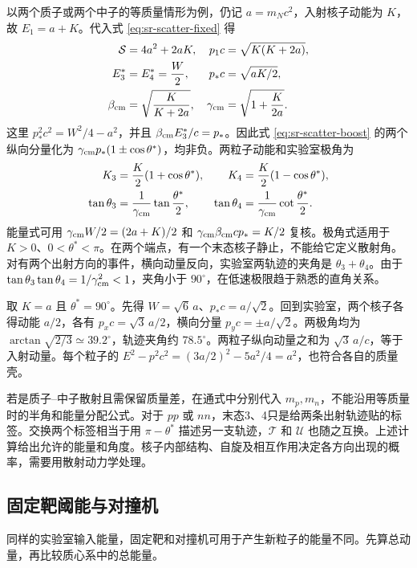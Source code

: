 以两个质子或两个中子的等质量情形为例，仍记 $a=m_Nc^2$，入射核子动能为 $K$，故 $E_1=a+K$。代入式 \eqref{eq:sr-scatter-fixed} 得
\begin{align*}
\mathcal S&=4a^2+2aK,& p_1c&=\sqrt{K(K+2a)},\\
E_3^*&=E_4^*=\frac{W}{2},&
p_*c&=\sqrt{aK/2},\\
\beta_{\rm cm}&=\sqrt{\frac{K}{K+2a}},&
\gamma_{\rm cm}&=\sqrt{1+\frac{K}{2a}} .
\end{align*}
这里 $p_*^2c^2=W^2/4-a^2$，并且 $\beta_{\rm cm}E_3^*/c=p_*$。因此式 \eqref{eq:sr-scatter-boost} 的两个纵向分量化为 $\gamma_{\rm cm}p_*(1\pm\cos\theta^*)$，均非负。两粒子动能和实验室极角为
\begin{align}
K_3&=\frac K2(1+\cos\theta^*),&
K_4&=\frac K2(1-\cos\theta^*),\nonumber\\
\tan\theta_3&=\frac{1}{\gamma_{\rm cm}}\tan\frac{\theta^*}{2},&
\tan\theta_4&=\frac{1}{\gamma_{\rm cm}}\cot\frac{\theta^*}{2}.
\label{eq:sr-nn-lab}
\end{align}
能量式可用 $\gamma_{\rm cm}W/2=(2a+K)/2$ 和 $\gamma_{\rm cm}\beta_{\rm cm}cp_*=K/2$ 复核。极角式适用于 $K>0$、$0<\theta^*<\pi$。在两个端点，有一个末态核子静止，不能给它定义散射角。对有两个出射方向的事件，横向动量反向，实验室两轨迹的夹角是 $\theta_3+\theta_4$。由于 $\tan\theta_3\tan\theta_4=1/\gamma_{\rm cm}^2<1$，夹角小于 $90^\circ$，在低速极限趋于熟悉的直角关系。

\begin{example}[质心系直角散射怎样分配动能]
取 $K=a$ 且 $\theta^*=90^\circ$。先得 $W=\sqrt6\,a$、$p_*c=a/\sqrt2$。回到实验室，两个核子各得动能 $a/2$，各有 $p_xc=\sqrt3\,a/2$，横向分量 $p_yc=\pm a/\sqrt2$。两极角均为 $\arctan\sqrt{2/3}\simeq39.2^\circ$，轨迹夹角约 $78.5^\circ$。两粒子纵向动量之和为 $\sqrt3\,a/c$，等于入射动量。每个粒子的 $E^2-p^2c^2=(3a/2)^2-5a^2/4=a^2$，也符合各自的质量壳。
\end{example}

若是质子--中子散射且需保留质量差，在通式中分别代入 $m_p,m_n$，不能沿用等质量时的半角和能量分配公式。对于 $pp$ 或 $nn$，末态3、4只是给两条出射轨迹贴的标签。交换两个标签相当于用 $\pi-\theta^*$ 描述另一支轨迹，$\mathcal T$ 和 $\mathcal U$ 也随之互换。上述计算给出允许的能量和角度。核子内部结构、自旋及相互作用决定各方向出现的概率，需要用散射动力学处理。

\subsection{固定靶阈能与对撞机}
同样的实验室输入能量，固定靶和对撞机可用于产生新粒子的能量不同。先算总动量，再比较质心系中的总能量。

